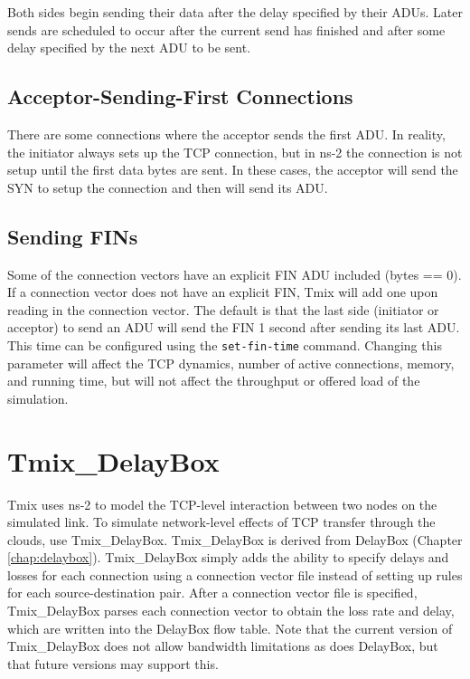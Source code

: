 Both sides begin sending their data after the delay specified by their
ADUs. Later sends are scheduled to occur after the current send
has finished and after some delay specified by the next ADU to be
sent.

\subsection{Acceptor-Sending-First Connections}
There are some connections where the acceptor sends the first ADU\@.  In reality, the initiator always sets up the TCP connection, but in ns-2 the connection is not setup until the first data bytes are sent.  In these cases, the acceptor will send the SYN to setup the connection and then will send its ADU\@.

\subsection{Sending FINs}
Some of the connection vectors have an explicit FIN ADU included
(bytes == 0).  If a connection vector does not have an explicit FIN,
Tmix will add one upon reading in the connection vector.  The default
is that the last side (initiator or acceptor) to send an ADU will send
the FIN 1 second after sending its last ADU.  This time can be
configured using the {\tt set-fin-time} command.  Changing this
parameter will affect the TCP dynamics, number of active connections,
memory, and running time, but will not affect the throughput or
offered load of the simulation.

\section{Tmix\_DelayBox}
\label{sec:tmix-db}

Tmix uses ns-2 to model the TCP-level interaction between two nodes on
the simulated link. To simulate network-level effects of TCP transfer
through the clouds, use Tmix\_DelayBox. Tmix\_DelayBox is derived from
DelayBox (Chapter \ref{chap:delaybox}).  Tmix\_DelayBox simply adds
the ability to specify delays and losses for each connection using a
connection vector file instead of setting up rules for each
source-destination pair.  After a connection vector file is specified,
Tmix\_DelayBox parses each connection vector to obtain the loss rate and
delay, which are written into the DelayBox flow table.  Note that the current version of Tmix\_DelayBox does not allow bandwidth limitations as does DelayBox, but that future versions may support this.

